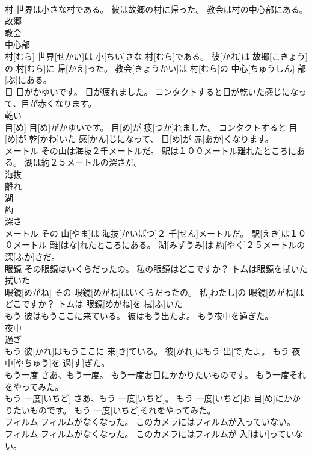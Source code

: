 \documentclass[8pt]{extreport}
\begin{document}
\begin{CJK}{UTF8}{min}
\\	村 世界は小さな村である。 彼は故郷の村に帰った。 教会は村の中心部にある。	
\\	故郷 
\\	教会 
\\	中心部 
\\	村[むら] 世界[せかい]は 小[ちい]さな 村[むら]である。 彼[かれ]は 故郷[こきょう]の 村[むら]に 帰[かえ]った。 教会[きょうかい]は 村[むら]の 中心[ちゅうしん] 部[ぶ]にある。
\\	目 目がかゆいです。 目が疲れました。 コンタクトすると目が乾いた感じになって、目が赤くなります。	
\\	乾い 
\\	目[め] 目[め]がかゆいです。 目[め]が 疲[つか]れました。 コンタクトすると 目[め]が 乾[かわ]いた 感[かん]じになって、 目[め]が 赤[あか]くなります。
\\	メートル その山は海抜２千メートルだ。 駅は１００メートル離れたところにある。 湖は約２５メートルの深さだ。	
\\	海抜 
\\	離れ 
\\	湖 
\\	約 
\\	深さ 
\\	メートル その 山[やま]は 海抜[かいばつ]２ 千[せん]メートルだ。 駅[えき]は１００メートル 離[はな]れたところにある。 湖[みずうみ]は 約[やく]２５メートルの 深[ふか]さだ。
\\	眼鏡 その眼鏡はいくらだったの。 私の眼鏡はどこですか？ トムは眼鏡を拭いた	
\\	拭いた 
\\	眼鏡[めがね] その 眼鏡[めがね]はいくらだったの。 私[わたし]の 眼鏡[めがね]はどこですか？ トムは 眼鏡[めがね]を 拭[ふ]いた
\\	もう 彼はもうここに来ている。 彼はもう出たよ。 もう夜中を過ぎた。	
\\	夜中 
\\	過ぎ 
\\	もう 彼[かれ]はもうここに 来[き]ている。 彼[かれ]はもう 出[で]たよ。 もう 夜中[やちゅう]を 過[す]ぎた。
\\	もう一度 さあ、もう一度。 もう一度お目にかかりたいものです。 もう一度それをやってみた。	
\\	もう 一度[いちど] さあ、もう 一度[いちど]。 もう 一度[いちど]お 目[め]にかかりたいものです。 もう 一度[いちど]それをやってみた。
\\	フィルム フィルムがなくなった。 このカメラにはフィルムが入っていない。	
\\	フィルム フィルムがなくなった。 このカメラにはフィルムが 入[はい]っていない。

\end{CJK}
\end{document}
